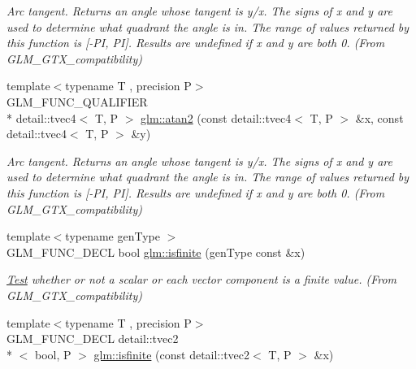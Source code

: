 \begin{DoxyCompactItemize}
\begin{DoxyCompactList}\small\item\em Arc tangent. Returns an angle whose tangent is y/x. The signs of x and y are used to determine what quadrant the angle is in. The range of values returned by this function is \mbox{[}-\/\-P\-I, P\-I\mbox{]}. Results are undefined if x and y are both 0. (From G\-L\-M\-\_\-\-G\-T\-X\-\_\-compatibility) \end{DoxyCompactList}\item 
\hypertarget{group__gtx__compatibility_ga3b9f0577d1b5d76c0f6ab04e28599fc4}{{\footnotesize template$<$typename T , precision P$>$ }\\G\-L\-M\-\_\-\-F\-U\-N\-C\-\_\-\-Q\-U\-A\-L\-I\-F\-I\-E\-R \\*
detail\-::tvec4$<$ T, P $>$ \hyperlink{group__gtx__compatibility_ga3b9f0577d1b5d76c0f6ab04e28599fc4}{glm\-::atan2} (const detail\-::tvec4$<$ T, P $>$ \&x, const detail\-::tvec4$<$ T, P $>$ \&y)}\label{group__gtx__compatibility_ga3b9f0577d1b5d76c0f6ab04e28599fc4}

\begin{DoxyCompactList}\small\item\em Arc tangent. Returns an angle whose tangent is y/x. The signs of x and y are used to determine what quadrant the angle is in. The range of values returned by this function is \mbox{[}-\/\-P\-I, P\-I\mbox{]}. Results are undefined if x and y are both 0. (From G\-L\-M\-\_\-\-G\-T\-X\-\_\-compatibility) \end{DoxyCompactList}\item 
\hypertarget{group__gtx__compatibility_gaf4b04dcd3526996d68c1bfe17bfc8657}{{\footnotesize template$<$typename gen\-Type $>$ }\\G\-L\-M\-\_\-\-F\-U\-N\-C\-\_\-\-D\-E\-C\-L bool \hyperlink{group__gtx__compatibility_gaf4b04dcd3526996d68c1bfe17bfc8657}{glm\-::isfinite} (gen\-Type const \&x)}\label{group__gtx__compatibility_gaf4b04dcd3526996d68c1bfe17bfc8657}

\begin{DoxyCompactList}\small\item\em \hyperlink{class_test}{Test} whether or not a scalar or each vector component is a finite value. (From G\-L\-M\-\_\-\-G\-T\-X\-\_\-compatibility) \end{DoxyCompactList}\item 
\hypertarget{group__gtx__compatibility_ga604f38239da3a5b5b1e4fe06dec7f64d}{{\footnotesize template$<$typename T , precision P$>$ }\\G\-L\-M\-\_\-\-F\-U\-N\-C\-\_\-\-D\-E\-C\-L detail\-::tvec2\\*
$<$ bool, P $>$ \hyperlink{group__gtx__compatibility_ga604f38239da3a5b5b1e4fe06dec7f64d}{glm\-::isfinite} (const detail\-::tvec2$<$ T, P $>$ \&x)}\label{group__gtx__compatibility_ga604f38239da3a5b5b1e4fe06dec7f64d}


\end{DoxyCompactItemize}
